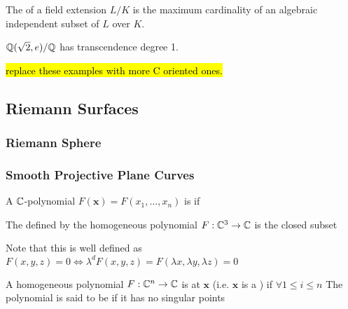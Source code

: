 \documentclass{article}
\begin{document}
\begin{definition}
	The  of a field extension $L/K$ is the maximum cardinality of an algebraic independent subset of $L$ over $K$. 
\end{definition}

\begin{example}
	$\mathbb{Q}(\sqrt{2},e)/\mathbb{Q}$ has transcendence degree 1.
\end{example}

\hl{replace these examples with more C oriented ones. }


\subsection{Riemann Surfaces}

\subsubsection{Riemann Sphere}

\subsubsection{Smooth Projective Plane Curves}

\begin{definition}
	A $\mathbb{C}$-polynomial $F(\bm{x})=F(x_1, \dots, x_n)$ is  if 
\end{definition}

\begin{definition}
	The  defined by the homogeneous polynomial $F:\mathbb{C}^3 \to \mathbb{C}$ is the closed subset
\end{definition}

\begin{remark}
	Note that this is well defined as $F(x,y,z) = 0 \Leftrightarrow \lambda^d F(x,y,z)=F(\lambda x, \lambda y, \lambda z)=0$
\end{remark}

\begin{definition}
	A homogeneous polynomial $F:\mathbb{C}^n \to \mathbb{C}$ is  at $\bm{x}$ (i.e. $\bm{x}$ is a ) if $\forall 1 \leq i \leq n$
The polynomial is said to be  if it has no singular points
\end{definition}
\end{document}
